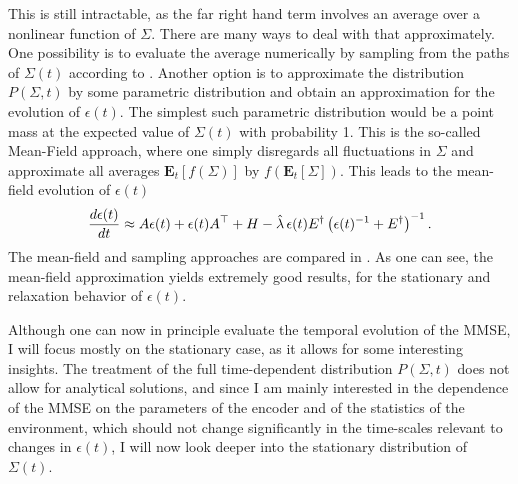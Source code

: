 This is still intractable, as the far right hand term involves an average over a nonlinear function of $\Sigma$. There are many ways to deal with that approximately. 
One possibility is to evaluate the average numerically by sampling from the paths of $\Sigma(t)$ according to . Another option is to 
approximate the distribution $P(\Sigma,t)$ by some parametric distribution and obtain an approximation for the evolution of $\epsilon(t)$.  The simplest such parametric distribution 
would be a point mass at the expected value of $\Sigma(t)$ with probability 1. This is the 
so-called Mean-Field approach, where one simply disregards all fluctuations in $\Sigma$ and approximate all averages $\boldsymbol{E}_t[f(\Sigma)]$ by $f(\boldsymbol{E}_t[\Sigma])$. This leads to the 
mean-field evolution of $\epsilon(t)$
\begin{equation}
\label{eq:eps_mf}
\frac{d\epsilon(t)}{dt} \approx A\epsilon(t) + \epsilon(t) A^\top + H -\hat{\lambda} \,\epsilon(t) \covar^\dagger \left(\epsilon(t)^{-1}+\covar^\dagger\right)^{-1}.
\end{equation}
The mean-field and sampling approaches are compared in . As one can see, the mean-field approximation yields extremely good results, for the stationary and relaxation behavior of $\epsilon(t)$.\par

Although one can now in principle evaluate the temporal evolution of the MMSE, I will focus mostly on the stationary case, as it allows for some interesting insights. The treatment
of the full time-dependent distribution $P(\Sigma,t)$ does not allow for analytical solutions, and since I am mainly interested in the dependence of the MMSE on the parameters of
the encoder and of the statistics of the environment, which should not change significantly in the time-scales relevant to changes in $\epsilon(t)$, I will now look deeper into the
stationary distribution of $\Sigma(t)$.

